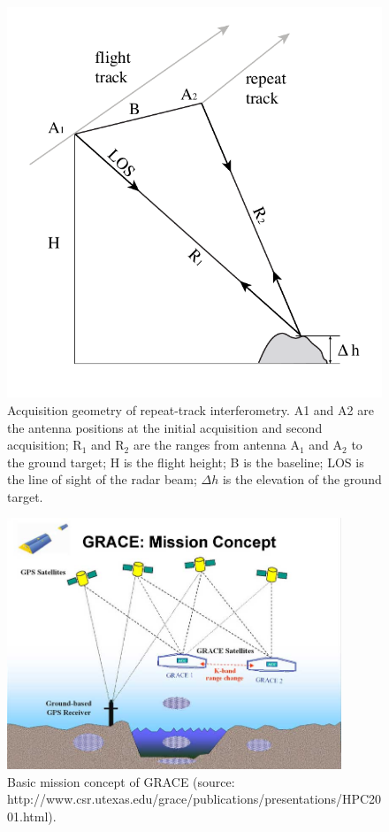 \clearpage
\begin{figure}
	\centering
	\includegraphics{figs_chpt2/Fig5}	
	\caption[Acquisition geometry of repeat-track interferometry.]{Acquisition geometry of repeat-track interferometry.  A1 and A2 are the antenna positions at the initial acquisition and second acquisition; R$_{1}$ and R$_{2}$  are the ranges from antenna A$_{1}$ and A$_{2}$ to the ground target; H is the flight height; B is the baseline; LOS is the line of sight of the radar beam; $\Delta h$ is the elevation of the ground target.}
	\label{fig:chpt2_fig5}
\end{figure}

\clearpage
\begin{figure}
	\centering
	\includegraphics[width=100mm]{figs_chpt2/Fig6.jpg}	
	\caption[Basic mission concept of GRACE.]{Basic mission concept of GRACE (source: http://www.csr.utexas.edu/grace/publications/presentations/HPC2001.html).}
	\label{fig:chpt2_fig6}
\end{figure}

